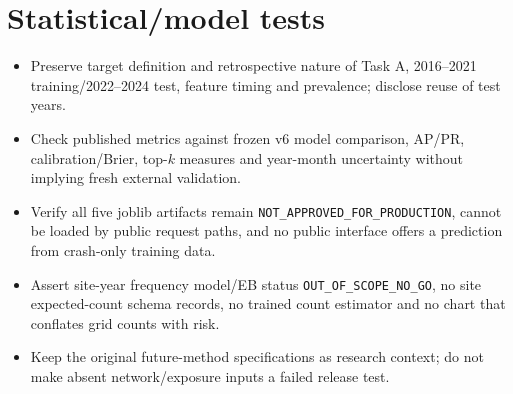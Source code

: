 \documentclass[11pt,a4paper,openany]{report}
\newcommand{\pathcode}[1]{\nolinkurl{#1}}
\begin{document}
\section{Statistical/model tests}
\begin{itemize}
\item Preserve target definition and retrospective nature of Task A, 2016--2021 training/2022--2024 test, feature timing and prevalence; disclose reuse of test years.
\item Check published metrics against frozen v6 model comparison, AP/PR, calibration/Brier, top-$k$ measures and year-month uncertainty without implying fresh external validation.
\item Verify all five joblib artifacts remain \pathcode{NOT_APPROVED_FOR_PRODUCTION}, cannot be loaded by public request paths, and no public interface offers a prediction from crash-only training data.
\item Assert site-year frequency model/EB status \pathcode{OUT_OF_SCOPE_NO_GO}, no site expected-count schema records, no trained count estimator and no chart that conflates grid counts with risk.
\item Keep the original future-method specifications as research context; do not make absent network/exposure inputs a failed release test.
\end{itemize}
\end{document}
